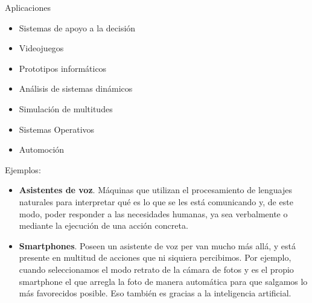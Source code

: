 \documentclass[11pt,aspectratio=169]{beamer}
\begin{document}
\begin{frame}{Aplicaciones}
    \begin{itemize}
        \item Sistemas de apoyo a la decisión\pause
        \item Videojuegos\pause
        \item Prototipos informáticos\pause
        \item Análisis de sistemas dinámicos\pause
        \item Simulación de multitudes\pause
        \item Sistemas Operativos\pause
        \item Automoción
    \end{itemize}
\end{frame}


\begin{frame}{Ejemplos:}
    \begin{itemize}
        \item \textbf{Asistentes de voz}. 
            Máquinas que utilizan el procesamiento de lenguajes naturales para interpretar qué es lo que se les está comunicando 
            y, de este modo, poder responder a las necesidades humanas, ya sea verbalmente o mediante la ejecución de una acción concreta. \pause
        
        \item \textbf{Smartphones}.
            Poseen un asistente de voz per van mucho más allá, y está presente en multitud de acciones que ni siquiera percibimos. Por ejemplo, cuando 
            seleccionamos el modo retrato de la cámara de fotos y es el propio smartphone el que arregla la foto de manera automática para que salgamos 
            lo más favorecidos posible. Eso también es gracias a la inteligencia artificial. \pause
    \end{itemize}
\end{frame}
    
\end{document}
